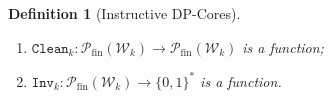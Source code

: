 \documentclass[11pt,a4paper]{article}
\newtheorem{definition}[theorem]{Definition}
\newcommand{\treewidthvalue}{k}
\newcommand{\alphabet}{\Sigma}
\newcommand{\N}{\mathbb{N}}
\newcommand{\weightwitnessfunction}{\mathtt{Weight}}
\newcommand{\cleaningfunctioncore}{\mathtt{Clean}}
\newcommand{\asymbol}{a}
\newcommand{\arity}{\mathfrak{a}}
\newcommand{\allwitnesses}{\mathcal{W}}
\newcommand{\finitepowerset}[1]{\mathcal{P}_{\mathrm{fin}}(#1)}
\newcommand{\invariantCore}{\mathtt{Inv}}
\begin{document}
\begin{definition}[Instructive DP-Cores]
\begin{enumerate}
\begin{itemize}
\end{itemize}
\item $\cleaningfunctioncore_{\treewidthvalue}:\finitepowerset{\allwitnesses_{\treewidthvalue}} \rightarrow \finitepowerset{\allwitnesses_{\treewidthvalue}}$ is a function;
\item $\invariantCore_{\treewidthvalue}:\finitepowerset{\allwitnesses_{\treewidthvalue}} \rightarrow \{0,1\}^*$ is a function.
\end{enumerate}
\end{definition}
\end{document}
